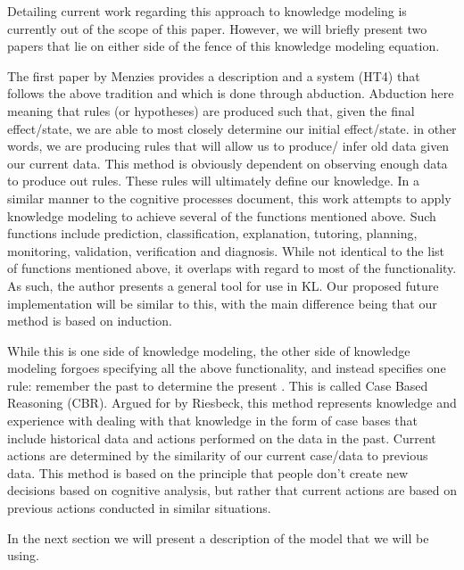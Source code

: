 Detailing current work regarding this approach to knowledge modeling is currently out of the scope of this paper. However, we will briefly present two papers that lie on either side of the fence of this knowledge modeling equation. 

The first paper \cite{Menzies1996} by Menzies provides a description and a system (HT4) that follows the above tradition and which is done through abduction. Abduction here meaning that rules (or hypotheses) are produced such that, given the final effect/state, we are able to most closely determine our initial effect/state. in other words, we are producing rules that will allow us to produce/ infer old data given our current data. This method is obviously dependent on observing enough data to produce out rules. These rules will ultimately define our knowledge. In a similar manner to the cognitive processes document, this work attempts to apply knowledge modeling to achieve several of the functions mentioned above. Such functions include prediction, classification, explanation, tutoring, planning, monitoring, validation, verification and diagnosis. While not identical to the list of functions mentioned above, it overlaps with regard to most of the functionality. As such, the author presents a general tool for use in KL. Our proposed future implementation will be similar to this, with the main difference being that our method is based on induction.

While this ‎is one side of knowledge modeling, the other side of knowledge modeling forgoes specifying all the above functionality, and instead specifies one rule: remember the past to determine the present \cite{riesbeck96}. This is called Case Based Reasoning (CBR). Argued for by Riesbeck, this method represents knowledge and experience with dealing with that knowledge in the form of case bases that include historical data and actions performed on the data in the past. Current actions are determined by the similarity of our current case/data to previous data. This method is based on the principle that people don't create new decisions based on cognitive analysis, but rather that current actions are based on previous actions conducted in similar situations. 

In the next section we will present a description of the model that we will be using.





